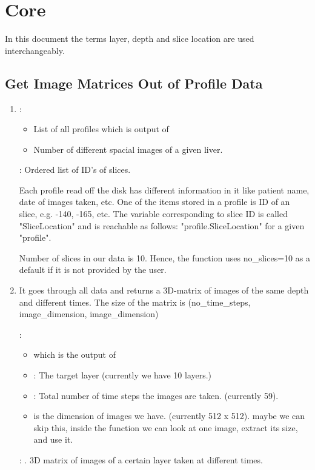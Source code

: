 \section{Core}
In this document the terms layer, depth and slice location are used interchangeably.
\subsection{Get Image Matrices Out of Profile Data}
\begin{enumerate}
\item {} 

: 
\begin{itemize}
\item {} List of all profiles which is output of 
\item {} Number of different spacial images of a given liver.
\end{itemize}

: Ordered list of  ID's of slices.

Each profile read off the disk has different 
information in it like patient name, date of images taken, etc.
One of the items stored in a profile is ID of 
an slice, e.g. -140, -165, etc. The variable 
corresponding to slice ID is called "SliceLocation" 
and is reachable as follows: "profile.SliceLocation" for a given "profile".

Number of slices in our data is 10. Hence, the function 
uses no\_slices=10 as a default if it is not provided by the user.
\vspace{.2in}

\item {\small {}}

It goes through all data and returns a 3D-matrix of images of the same depth and different times.
The size of the matrix is 
{\small{(no\_time\_steps, image\_dimension, image\_dimension)}}

\textbf{}:
\begin{itemize}
\item {} which is the output of {}
\item {}: The target layer (currently we have 10 layers.)
\item {}: Total number of time steps the images are taken. (currently 59).
\item {} is the dimension of images we have. (currently 512 x 512).
maybe we can skip this, inside the function we can look at one image, extract its size, and use it.
\end{itemize}

\textbf{}: . 3D matrix of images of a certain layer taken at different times.
\end{enumerate}

